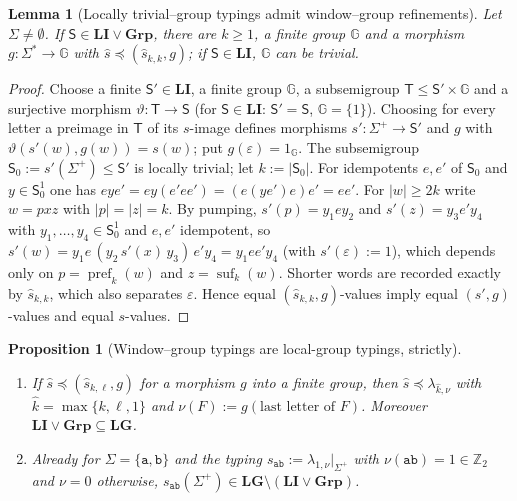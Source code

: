 \documentclass[11pt]{article}
\numberwithin{equation}{section}
\theoremstyle{plain}
\newtheorem{lemma}[theorem]{Lemma}
\newtheorem{proposition}[theorem]{Proposition}
\theoremstyle{definition}
\theoremstyle{remark}
\newcommand{\eps}{\varepsilon}
\theoremstyle{plain}
\begin{document}
\begin{lemma}[Locally trivial--group typings admit window--group refinements]
\label{lem:mcfg-li-group-window}
Let $\Sigma\ne\emptyset$.  If $\mathsf S\in\mathbf{LI}\vee\mathbf{Grp}$, there are
$k\ge1$, a finite group ${\mathbb G}$ and a morphism $g:\Sigma^*\to {\mathbb G}$ with
$\widehat s\preceq(\widehat s_{k,k},g)$; if $\mathsf S\in\mathbf{LI}$, ${\mathbb G}$ can be
trivial.
\end{lemma}

\begin{proof}
Choose a finite $\mathsf S'\in\mathbf{LI}$, a finite group ${\mathbb G}$, a subsemigroup
$\mathsf T\le \mathsf S'\times {\mathbb G}$ and a surjective morphism $\vartheta:\mathsf T\to\mathsf S$ (for
$\mathsf S\in\mathbf{LI}$: $\mathsf S'=\mathsf S$, ${\mathbb G}=\{1\}$).  Choosing for every letter a preimage in $\mathsf T$
of its $s$-image defines morphisms $s':\Sigma^+\to\mathsf S'$ and $g$ with
$\vartheta(s'(w),g(w))=s(w)$; put $g(\eps)=1_{\mathbb G}$.  The subsemigroup
$\mathsf S_0:=s'(\Sigma^+)\le \mathsf S'$ is locally trivial; let $k:=|\mathsf S_0|$.  For
idempotents $e,e'$ of $\mathsf S_0$ and $y\in \mathsf S_0^1$ one has
$eye'=ey(e'ee')=(e(ye')e)e'=ee'$.
For $|w|\ge2k$ write $w=pxz$ with $|p|=|z|=k$.  By pumping,
$s'(p)=y_1ey_2$ and $s'(z)=y_3e'y_4$ with $y_1,\ldots,y_4\in \mathsf S_0^1$ and $e,e'$
idempotent, so $s'(w)=y_1e\,(y_2\,s'(x)\,y_3)\,e'y_4=y_1ee'y_4$ (with $s'(\eps):=1$), which
depends only on $p=\operatorname{pref}_k(w)$ and $z=\operatorname{suf}_k(w)$.
Shorter words are recorded exactly by $\widehat s_{k,k}$, which also separates
$\eps$.  Hence equal $(\widehat s_{k,k},g)$-values imply equal $(s',g)$-values and
equal $s$-values.
\end{proof}

\begin{proposition}[Window--group typings are local-group typings, strictly]
\label{prop:li-g-strict}
\begin{enumerate}[label=\textup{(\roman*)},leftmargin=*]
\item If $\widehat s\preceq(\widehat s_{k,\ell},g)$ for a morphism $g$ into a finite
group, then $\widehat s\preceq\lambda_{\hat k,\nu}$ with $\hat k=\max\{k,\ell,1\}$ and
$\nu(F):=g(\text{last letter of }F)$.  Moreover $\mathbf{LI}\vee\mathbf{Grp}\subseteq\mathbf{LG}$.
\item Already for $\Sigma=\{\mathtt a,\mathtt b\}$ and
the typing $s_{\mathtt{ab}}:=\lambda_{1,\nu}|_{\Sigma^+}$ with
$\nu(\mathtt{ab})=1\in\mathbb Z_2$ and $\nu=0$ otherwise,
$s_{\mathtt{ab}}(\Sigma^+)\in\mathbf{LG}\setminus(\mathbf{LI}\vee\mathbf{Grp})$.
\end{enumerate}
\end{proposition}
\end{document}
